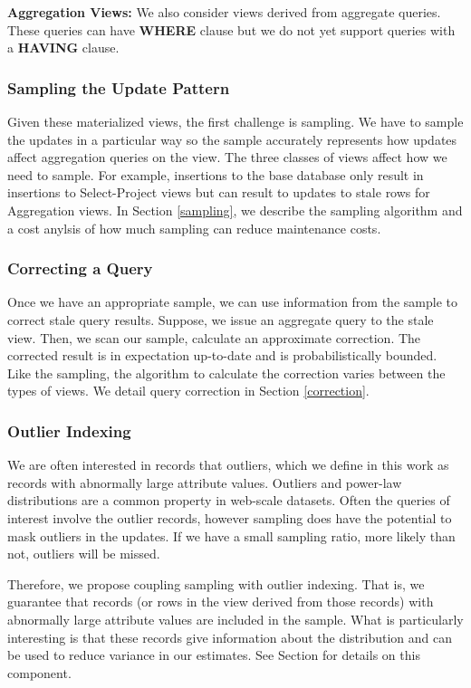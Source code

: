 \vspace{1em}

\noindent\textbf{Aggregation Views: } We also consider views derived from aggregate queries. These queries can have \textbf{WHERE} clause but we do not yet support queries with a \textbf{HAVING} clause.

\subsubsection{Sampling the Update Pattern}
Given these materialized views, the first challenge is sampling.
We have to sample the updates in a particular way so the sample accurately represents how updates
affect aggregation queries on the view. 
The three classes of views affect how we need to sample.
For example, insertions to the base database only result in insertions to Select-Project views but can result to updates to stale rows for Aggregation views.
In Section \ref{sampling}, we describe the sampling algorithm and a cost anylsis of how much sampling can reduce maintenance costs.

\subsubsection{Correcting a Query}
Once we have an appropriate sample, we can use information from the sample to correct stale query results.
Suppose, we issue an aggregate query to the stale view.
Then, we scan our sample, calculate an approximate correction.
The corrected result is in expectation up-to-date and is probabilistically bounded.
Like the sampling, the algorithm to calculate the correction varies between the types of views.
We detail query correction in Section \ref{correction}.

\subsubsection{Outlier Indexing}
We are often interested in records that outliers, 
which we define in this work as records with abnormally large attribute values.
Outliers and power-law distributions are a common property in web-scale datasets.
Often the queries of interest involve the outlier records, however sampling does 
have the potential to mask outliers in the updates.
If we have a small sampling ratio, more likely than not, outliers will be missed.

Therefore, we propose coupling sampling with outlier indexing. 
That is, we guarantee that records (or rows in the view derived from those records) 
with abnormally large attribute values are included in the sample.
What is particularly interesting is that these records give information about the distribution 
and can be used to reduce variance in our estimates.
See Section \label{outlier} for details on this component.


